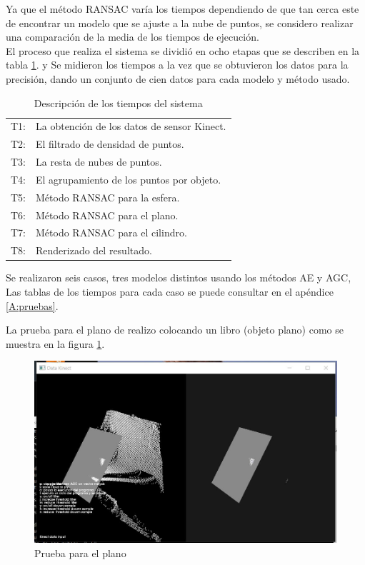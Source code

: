	 
	 
	
	Ya que el método RANSAC varía los tiempos dependiendo de que tan cerca este de encontrar un modelo que se ajuste a la nube de puntos, se considero realizar una comparación de la media de los tiempos de ejecución.\\
	
	 El proceso que realiza el sistema se dividió en ocho etapas que se describen en la tabla \ref{tab:DefTiempos}. y Se midieron los tiempos a la vez que se obtuvieron los datos para la precisión, dando un conjunto de cien datos para cada modelo y método usado.
	
	\begin{table}[!htb]
		\caption{Descripción de los tiempos del sistema}
		\centering
		\begin{tabular}{ll}
		\hline
		 T1:& La obtención de los datos de sensor Kinect.\\
		 T2:& El filtrado de densidad de puntos.\\
		 T3:& La resta de nubes de puntos.\\
		 T4:& El agrupamiento de los puntos por objeto.\\
		 T5:& Método RANSAC para la esfera.\\
		 T6:& Método RANSAC para el plano.\\
		 T7:& Método RANSAC para el cilindro.\\
		 T8:& Renderizado del resultado.\\
		
		\hline
	\end{tabular}
\label{tab:DefTiempos}
\end{table}
	
	Se realizaron seis casos, tres modelos distintos usando los métodos AE y AGC, Las tablas de los tiempos para cada caso se puede consultar en el apéndice \ref{A:pruebas}.
	


La prueba para el \gls{plano} de realizo colocando un libro (objeto plano) como se muestra en la figura \ref{fig:pruebaPla}.


\begin{figure}[!htb] 
	\centering
	\includegraphics[width=1\textwidth]{03Resultados/imagenes/plano.JPG}
	\caption{Prueba para el plano} 
	\label{fig:pruebaPla}
\end{figure}


